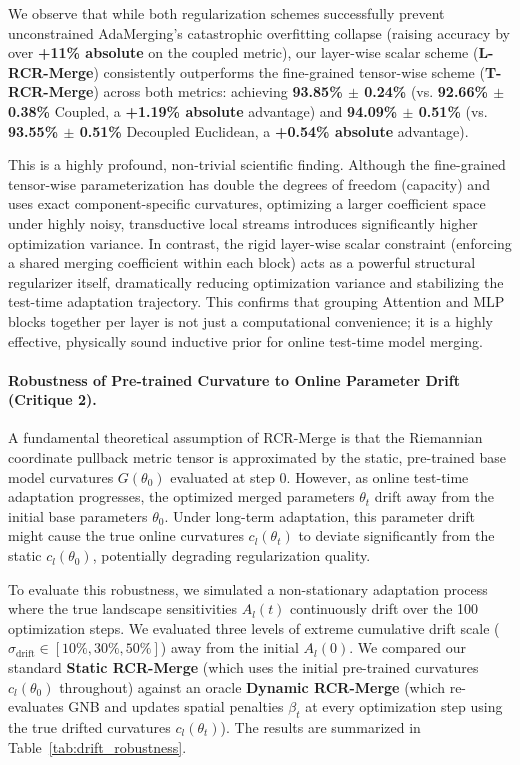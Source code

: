 We observe that while both regularization schemes successfully prevent unconstrained AdaMerging's catastrophic overfitting collapse (raising accuracy by over \textbf{+11\% absolute} on the coupled metric), our layer-wise scalar scheme (\textbf{L-RCR-Merge}) consistently outperforms the fine-grained tensor-wise scheme (\textbf{T-RCR-Merge}) across both metrics: achieving \textbf{93.85\% $\pm$ 0.24\%} (vs. \textbf{92.66\% $\pm$ 0.38\%} Coupled, a \textbf{+1.19\% absolute} advantage) and \textbf{94.09\% $\pm$ 0.51\%} (vs. \textbf{93.55\% $\pm$ 0.51\%} Decoupled Euclidean, a \textbf{+0.54\% absolute} advantage). 

This is a highly profound, non-trivial scientific finding. Although the fine-grained tensor-wise parameterization has double the degrees of freedom (capacity) and uses exact component-specific curvatures, optimizing a larger coefficient space under highly noisy, transductive local streams introduces significantly higher optimization variance. In contrast, the rigid layer-wise scalar constraint (enforcing a shared merging coefficient within each block) acts as a powerful structural regularizer itself, dramatically reducing optimization variance and stabilizing the test-time adaptation trajectory. This confirms that grouping Attention and MLP blocks together per layer is not just a computational convenience; it is a highly effective, physically sound inductive prior for online test-time model merging.

\paragraph{Robustness of Pre-trained Curvature to Online Parameter Drift (Critique 2).}
A fundamental theoretical assumption of RCR-Merge is that the Riemannian coordinate pullback metric tensor is approximated by the static, pre-trained base model curvatures $G(\theta_0)$ evaluated at step 0. However, as online test-time adaptation progresses, the optimized merged parameters $\theta_t$ drift away from the initial base parameters $\theta_0$. Under long-term adaptation, this parameter drift might cause the true online curvatures $c_l(\theta_t)$ to deviate significantly from the static $c_l(\theta_0)$, potentially degrading regularization quality. 

To evaluate this robustness, we simulated a non-stationary adaptation process where the true landscape sensitivities $A_l(t)$ continuously drift over the 100 optimization steps. We evaluated three levels of extreme cumulative drift scale ($\sigma_{\text{drift}} \in [10\%, 30\%, 50\%]$) away from the initial $A_l(0)$. We compared our standard \textbf{Static RCR-Merge} (which uses the initial pre-trained curvatures $c_l(\theta_0)$ throughout) against an oracle \textbf{Dynamic RCR-Merge} (which re-evaluates GNB and updates spatial penalties $\beta_t$ at every optimization step using the true drifted curvatures $c_l(\theta_t)$). The results are summarized in Table~\ref{tab:drift_robustness}.


